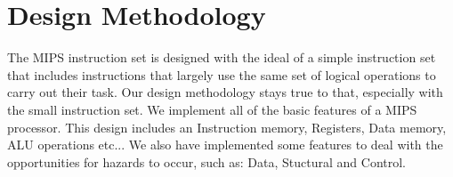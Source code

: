 \message{ !name(report.tex)}\documentclass{llncs}
\begin{document}
\section{Design Methodology}
The MIPS instruction set is designed with the ideal of a simple instruction set that includes instructions that largely use the same set of
 logical operations to carry out their task.  Our design methodology stays true to that, especially with the small instruction set.  We implement
 all of the basic features of a MIPS processor.  This design includes an Instruction memory, Registers, Data memory, ALU operations etc...
 We also have implemented some features to deal with the opportunities for hazards to occur, such as: Data, Stuctural and Control.

\end{document}
